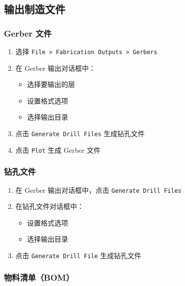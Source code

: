 \subsection{输出制造文件}

\subsubsection{Gerber 文件}


\begin{enumerate}
  \item 选择 \lstinline{File > Fabrication Outputs > Gerbers}
  \item 在 Gerber 输出对话框中：
    \begin{itemize}
      \item 选择要输出的层
      \item 设置格式选项
      \item 选择输出目录
    \end{itemize}
  \item 点击 \lstinline{Generate Drill Files} 生成钻孔文件
  \item 点击 \lstinline{Plot} 生成 Gerber 文件
\end{enumerate}

\subsubsection{钻孔文件}


\begin{enumerate}
  \item 在 Gerber 输出对话框中，点击 \lstinline{Generate Drill Files}
  \item 在钻孔文件对话框中：
    \begin{itemize}
      \item 设置格式选项
      \item 选择输出目录
    \end{itemize}
  \item 点击 \lstinline{Generate Drill File} 生成钻孔文件
\end{enumerate}

\subsubsection{物料清单（BOM）}


